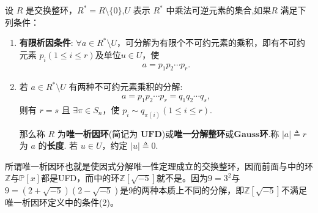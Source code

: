 \documentclass[../../main.tex]{subfiles}%
\begin{document}
\begin{definition}[唯一析因环]
设 \( R \) 是交换整环，\( R^* = R \setminus \{0\} \),\( U \) 表示 \( R^* \) 中乘法可逆元素的集合,如果\( R \) 满足下列条件：
\begin{enumerate}[(1)]
\item \textbf{有限析因条件}: \( \forall a \in R^* \setminus U \)，可分解为有限个不可约元素的乘积，即有不可约元素 \( p_i(1 \leqslant i \leqslant r) \)及单位$u\in U$，使
\begin{align*}
a = p_1p_2\cdots p_r.
\end{align*}

\item 若 \( a \in R^* \setminus U \) 有两种不可约元素乘积的分解:
\begin{align*}
a = p_1p_2\cdots p_r = q_1q_2\cdots q_s,
\end{align*}
则有 \( r = s \) 且 \( \exists \pi \in S_n \)，使 \( p_i \sim q_{\pi(i)}(1 \leqslant i \leqslant r) \). 

那么称 \( R \) 为\textbf{唯一析因环}(简记为 $\mathbf{UFD}$)或\textbf{唯一分解整环}或$\mathbf{Gauss}$\textbf{环}.称 \( |a| \triangleq r \) 为 \( a \) 的\textbf{长度}. 若 \( u \in U \)，约定 \( |u| \triangleq 0 \).
\end{enumerate}
\end{definition}
\begin{remark}
所谓唯一析因环也就是使因式分解唯一性定理成立的交换整环，因而前面与中的环$\mathbb{Z}$与$\mathbb{P}[x]$都是UFD，而中的环$\mathbb{Z}[\sqrt{-5}]$就不是。因为$9 = 3^2$与$9 = (2 + \sqrt{-5})(2 - \sqrt{-5})$是9的两种本质上不同的分解，即$\mathbb{Z}[\sqrt{-5}]$不满足唯一析因环定义中的条件(2)。

\end{remark}
\end{document}
